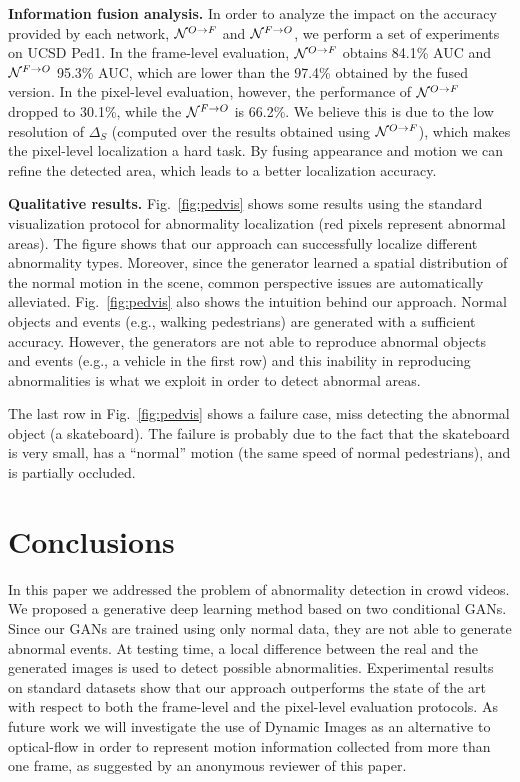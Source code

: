 \documentclass{article}
\begin{document}
	\noindent\textbf{Information fusion analysis.}
	In order to analyze the impact on the accuracy provided by each network, ${\cal N}^{O \rightarrow F}$ and ${\cal N}^{F \rightarrow O}$, we perform a set of experiments on UCSD Ped1. In the frame-level evaluation, ${\cal N}^{O \rightarrow F}$ obtains 84.1\% AUC and ${\cal N}^{F \rightarrow O}$ 95.3\% AUC, which are lower than the 97.4\% obtained by the fused version. In the pixel-level evaluation, however, the performance of ${\cal N}^{O \rightarrow F}$ dropped to 30.1\%, while the ${\cal N}^{F \rightarrow O}$ is 66.2\%. 
We believe this is due to the low resolution of $\Delta_S$ (computed over the results obtained using
${\cal N}^{O \rightarrow F}$), which makes the pixel-level localization a hard task.
By fusing appearance and motion we can refine the detected area, which leads to a better localization accuracy. 
	
	\noindent\textbf{Qualitative results.} 
Fig.~\ref{fig:pedvis} shows some results using the standard visualization protocol for abnormality localization (red pixels represent abnormal areas). The figure shows that our approach can successfully localize different abnormality types. Moreover, since the generator learned a spatial distribution of the normal motion in the scene, common perspective issues are automatically alleviated. Fig.~\ref{fig:pedvis} also shows the intuition behind our approach. Normal objects and events (e.g., walking pedestrians) are generated with a sufficient accuracy. However, the generators are not able to reproduce abnormal objects and events (e.g., a vehicle in the first row) and this inability in reproducing abnormalities is what we exploit in order to detect abnormal areas. 

The last row in Fig.~\ref{fig:pedvis} shows a failure case, miss detecting the abnormal object (a skateboard). The failure is probably due to the fact that the skateboard is very small, has a ``normal'' motion (the same speed of normal pedestrians), and is partially occluded. 
	
	
	\section{Conclusions}
In this paper we addressed the problem of abnormality detection in crowd videos. We proposed a generative deep learning method based on two conditional GANs. 
	Since our GANs are trained using only normal data, they are not able to generate abnormal events. At testing time, a local difference between the real and the generated images is used to detect possible abnormalities.
	Experimental results on standard datasets show that our approach outperforms the state of the art with respect to both the frame-level and the pixel-level evaluation protocols. As future work we will investigate the use of Dynamic Images \cite{Bilen16a} as an alternative to optical-flow in order to represent motion information collected from more than one frame, as suggested by an anonymous reviewer of this paper.
	
	

	
	
\end{document}

